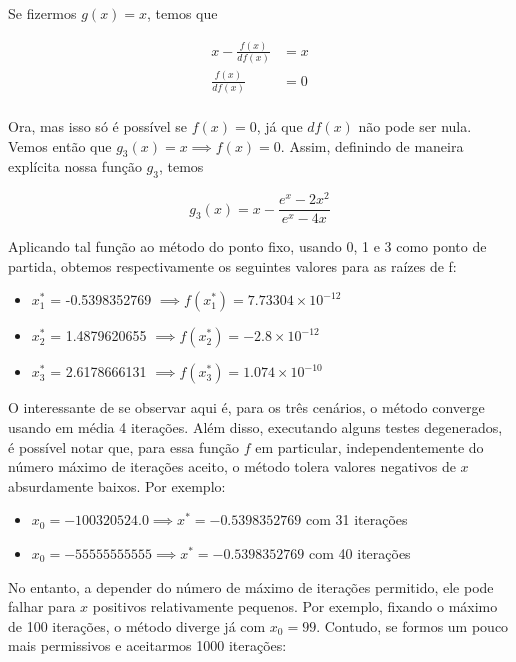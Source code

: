 \documentclass[11pt,reqno,a4paper]{amsart}
\begin{document}
\medskip
Se fizermos $g(x) = x$, temos que

\begin{align*}
    x - \frac{f(x)}{df(x)} &= x\\
    \frac{f(x)}{df(x)} &= 0\\
\end{align*}

\medskip
Ora, mas isso só é possível se $f(x) = 0$, já que $df(x)$ não pode ser nula. Vemos então que $g_3(x) = x \implies f(x) = 0$. Assim, definindo de maneira explícita nossa função $g_3$, temos

\begin{equation*}
    g_3(x) = x - \frac{e^x - 2x^2}{e^x - 4x}
\end{equation*}

\medskip
Aplicando tal função ao método do ponto fixo, usando 0, 1 e 3 como ponto de partida, obtemos respectivamente os seguintes valores para as raízes de f:

\bigskip
\begin{itemize}
    \item $x^{*}_1$ = -0.5398352769 $\implies f(x^{*}_1) = 7.73304×10^{-12}$ 
    \item $x^{*}_2$ = 1.4879620655 $\implies f(x^{*}_2) = -2.8 × 10^{-12}$
    \item $x^{*}_3$ = 2.6178666131 $\implies f(x^{*}_3) = 1.074×10^{-10}$ 
\end{itemize}

\bigskip
O interessante de se observar aqui é, para os três cenários, o método converge usando em média 4 iterações. Além disso, executando alguns testes degenerados, é possível notar que, para essa função $f$ em particular, independentemente do número máximo de iterações aceito, o método tolera valores negativos de $x$ absurdamente baixos. Por exemplo:

\bigskip
\begin{itemize}
    \item $x_0 = -100320524.0 \implies x^{*} = -0.5398352769$ com 31 iterações
    \item $x_0 = -55555555555 \implies x^{*} = -0.5398352769$ com 40 iterações
\end{itemize}

\bigskip
No entanto, a depender do número de máximo de iterações permitido, ele pode falhar para $x$ positivos relativamente pequenos. Por exemplo, fixando o máximo de 100 iterações, o método diverge já com $x_0 = 99$. Contudo, se formos um pouco mais permissivos e aceitarmos 1000 iterações:
\end{document}

